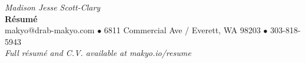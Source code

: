 
\begin{center}
  {\huge \textit{\color{titlegreydark} Madison Jesse Scott-Clary}}\\
  {\Huge{\textbf{R\'esum\'e}}}\\
  {\color{titlegreydark} makyo@drab-makyo.com $\bullet$ 6811 Commercial Ave / Everett, WA 98203 $\bullet$ 303-818-5943}\\
  {\small \color{titlegreylight} \textit{Full r\'esum\'e and C.V. available at makyo.io/resume}}
\end{center}
